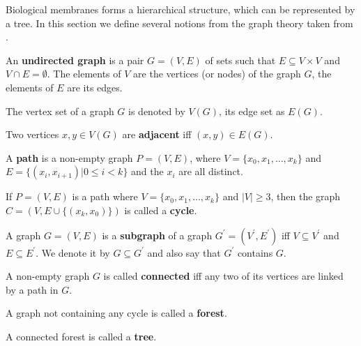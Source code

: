 Biological membranes forms a hierarchical structure, which can be represented by a tree. In this section we define several notions from the graph theory taken from \cite{Diestel97Graphs}.
\begin{definition}
  An  {\bf undirected graph} is a pair $G = (V,E)$ of sets such that $E\subseteq V\times V$ and $V\cap E = \emptyset$. The elements of $V$ are the vertices (or nodes) of the graph $G$, the elements of $E$ are its edges.
\end{definition}

The vertex set of a graph $G$ is denoted by $V(G)$, its edge set as $E(G)$.

\begin{definition}
  Two vertices $x,y\in V(G)$ are {\bf adjacent} iff $(x,y)\in E(G)$.
\end{definition}

\begin{definition}
  A {\bf path} is a non-empty graph $P=(V,E)$, where $V=\{x_0, x_1, \ldots, x_k\}$ and $E=\{(x_i,x_{i+1})|0\leq i < k\}$ and the $x_i$ are all distinct.
\end{definition}

\begin{definition}
  If $P=(V,E)$ is a path where $V=\{x_0, x_1, \ldots, x_k\}$ and $|V|\geq 3$, then the graph $C = (V,E\cup\{(x_k,x_0)\})$ is called a {\bf cycle}. 
\end{definition}

\begin{definition}
  A graph $G=(V,E)$ is a  {\bf subgraph} of a graph $G^\prime = (V^\prime, E^\prime)$ iff $V\subseteq V^\prime$ and $E\subseteq E^\prime$. We denote it by $G\subseteq G^\prime$ and also say that $G^\prime$ contains $G$.
\end{definition}

\begin{definition}
  A non-empty graph $G$ is called {\bf connected} iff any two of its vertices are linked by a path in $G$.
\end{definition}

\begin{definition}
  A graph not containing any cycle is called a {\bf forest}.
\end{definition}

\begin{definition}
  A connected forest is called a  {\bf tree}.
\end{definition}

